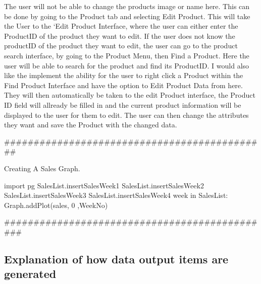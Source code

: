 The user will not be able to change the products image or name here. This can be done by going to the Product tab and selecting Edit Product. This will take the User to the `Edit Product Interface, where the user can either enter the ProductID of the product they want to edit. If the user does not know the productID of the product they want to edit, the user can go to the product search interface, by going to the Product Menu, then Find a Product. Here the user will be able to search for the product and find its ProductID. I would also like the implement the ability for the user to right click a Product within the Find Product Interface and have the option to Edit Product Data from here. They will then automatically be taken to the edit Product interface, the Product ID field will allready be filled in and the current product information will be displayed to the user for them to edit. The user can then change the attributes they want and save the Product with the changed data. 


#############################################

\begin{algorithm}[H]
\label{fig:repeat_pseudo_example}
\caption{Creating A Sales Graph.}
\begin{algorithmic}[1]
import pg
SalesList.insert{SalesWeek1}
SalesList.insert{SalesWeek2}
SalesList.insert{SalesWeek3}
SalesList.insert{SalesWeek4}
\FOR week in SalesList:
	Graph.addPlot(sales, 0 ,WeekNo)
\EndFor
\EndFunction
\end{algorithmic}
\end{algorithm}

##############################################

\subsection{Explanation of how data output items are generated}

